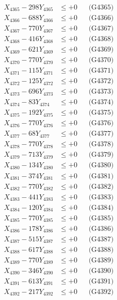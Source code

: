 \documentclass[a4paper,10pt]{article}
\begin{document}
{\begin{align}
X_{4365} - 298Y_{4365} &\leq +0 && \text{(G4365)} \\
X_{4366} - 688Y_{4366} &\leq +0 && \text{(G4366)} \\
X_{4367} - 770Y_{4367} &\leq +0 && \text{(G4367)} \\
X_{4368} - 416Y_{4368} &\leq +0 && \text{(G4368)} \\
X_{4369} - 621Y_{4369} &\leq +0 && \text{(G4369)} \\
X_{4370} - 770Y_{4370} &\leq +0 && \text{(G4370)} \\
\allowbreak
X_{4371} - 115Y_{4371} &\leq +0 && \text{(G4371)} \\
X_{4372} - 125Y_{4372} &\leq +0 && \text{(G4372)} \\
X_{4373} - 696Y_{4373} &\leq +0 && \text{(G4373)} \\
X_{4374} - 83Y_{4374} &\leq +0 && \text{(G4374)} \\
X_{4375} - 192Y_{4375} &\leq +0 && \text{(G4375)} \\
X_{4376} - 770Y_{4376} &\leq +0 && \text{(G4376)} \\
X_{4377} - 68Y_{4377} &\leq +0 && \text{(G4377)} \\
X_{4378} - 770Y_{4378} &\leq +0 && \text{(G4378)} \\
X_{4379} - 713Y_{4379} &\leq +0 && \text{(G4379)} \\
X_{4380} - 134Y_{4380} &\leq +0 && \text{(G4380)} \\
\allowbreak
X_{4381} - 374Y_{4381} &\leq +0 && \text{(G4381)} \\
X_{4382} - 770Y_{4382} &\leq +0 && \text{(G4382)} \\
X_{4383} - 441Y_{4383} &\leq +0 && \text{(G4383)} \\
X_{4384} - 120Y_{4384} &\leq +0 && \text{(G4384)} \\
X_{4385} - 770Y_{4385} &\leq +0 && \text{(G4385)} \\
X_{4386} - 178Y_{4386} &\leq +0 && \text{(G4386)} \\
X_{4387} - 515Y_{4387} &\leq +0 && \text{(G4387)} \\
X_{4388} - 617Y_{4388} &\leq +0 && \text{(G4388)} \\
X_{4389} - 770Y_{4389} &\leq +0 && \text{(G4389)} \\
X_{4390} - 346Y_{4390} &\leq +0 && \text{(G4390)} \\
\allowbreak
X_{4391} - 613Y_{4391} &\leq +0 && \text{(G4391)} \\
X_{4392} - 217Y_{4392} &\leq +0 && \text{(G4392)} \\

\end{align}}
\end{document}
